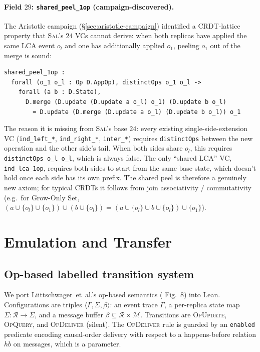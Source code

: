 \documentclass[11pt,a4paper]{article}
\theoremstyle{definition}
\theoremstyle{remark}
\newcommand{\State}{\Sigma}
\newcommand{\Replica}{\mathcal{R}}
\newcommand{\Msg}{\mathcal{M}}
\newcommand{\Sal}{\textsc{Sal}}
\begin{document}
\paragraph{Field $29$: \texttt{shared\_peel\_1op} (campaign-discovered).}
The Aristotle campaign (\S\ref{sec:aristotle-campaign}) identified
a CRDT-lattice property that \Sal{}'s $24$ VCs cannot derive: when
both replicas have applied the same LCA event $o_l$ and one has
additionally applied $o_1$, peeling $o_1$ out of the merge is sound:
\begin{lstlisting}[caption={The shared-element 1-op peel field.},
                   label=lst:shared-peel-1op]
shared_peel_1op :
  forall (o_1 o_l : Op D.AppOp), distinctOps o_1 o_l ->
    forall (a b : D.State),
      D.merge (D.update (D.update a o_l) o_1) (D.update b o_l)
        = D.update (D.merge (D.update a o_l) (D.update b o_l)) o_1
\end{lstlisting}
The reason it is missing from \Sal{}'s base $24$: every existing
single-side-extension VC (\texttt{ind\_left\_*}, \texttt{ind\_right\_*},
\texttt{inter\_*}) requires \texttt{distinctOps} between the new
operation and the other side's tail. When both sides share $o_l$,
this requires \texttt{distinctOps o\_l o\_l}, which is always
false. The only ``shared LCA'' VC, \texttt{ind\_lca\_1op}, requires
both sides to start from the same base state, which doesn't hold
once each side has its own prefix. The shared peel is therefore a
genuinely new axiom; for typical CRDTs it follows from join
associativity / commutativity (e.g.\ for Grow-Only Set,
$(a \cup \{o_l\} \cup \{o_1\}) \cup (b \cup \{o_l\}) =
(a \cup \{o_l\} \cup b \cup \{o_l\}) \cup \{o_1\}$).

\section{Emulation and Transfer}
\label{sec:emulation}

\subsection{Op-based labelled transition system}
\label{sec:op-ts}

We port Liittschwager~et~al.'s op-based semantics
(\cite{liittschwager2025} Fig.~8) into Lean. Configurations are
triples $\langle \Gamma, \Sigma, \beta\rangle$: an event trace
$\Gamma$, a per-replica state map $\Sigma : \Replica \to \State$,
and a message buffer $\beta \subseteq \Replica \times \Msg$.
Transitions are
\textsc{OpUpdate}, \textsc{OpQuery}, and \textsc{OpDeliver}
(silent). The \textsc{OpDeliver} rule is guarded by an
\texttt{enabled} predicate encoding causal-order delivery with
respect to a happens-before relation $\mathit{hb}$ on messages,
which is a parameter.
\end{document}
